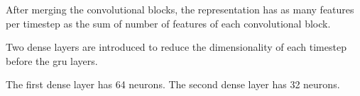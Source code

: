 
After merging the convolutional blocks, the representation
has as many features per timestep as the sum of number of
features of each convolutional block.

Two dense layers are introduced to reduce the dimensionality
of each timestep before the \gls{gru} layers.

The first dense layer has 64 neurons. The second dense layer
has 32 neurons.
